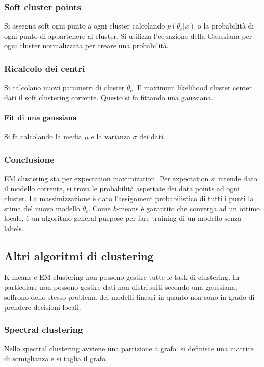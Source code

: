 \subsubsection{Soft cluster points}
Si assegna soft ogni punto a ogni cluster calcolando $p(\theta_c|x)$ o la probabilit\`a di ogni punto di appartenere al cluster.
Si utilizza l'equazione della Gaussiana per ogni cluster normalizzata per creare una probabilit\`a.

\subsubsection{Ricalcolo dei centri}
Si calcolano nuovi parametri di cluster $\theta_c$.
Il maximum likelihood cluster center dati il soft clustering corrente.
Questo si fa fittando una gaussiana.

\paragraph{Fit di una gaussiana}
Si fa calcolando la media $\mu$ e la varianza $\sigma$ dei dati.

\subsubsection{Conclusione}
EM clustering sta per expectation maximization.
Per expectation si intende dato il modello corrente, si trova le probabilit\`a aspettate dei data points ad ogni cluster.
La massimizzazione \`e dato l'assignment probabilistico di tutti i punti la stima del nuovo modello $\theta_c$.
Come $k$-means \`e garantito che converga ad un ottimo locale, \`e un algoritmo general purpose per fare training di un modello senza labels.

\subsection{Altri algoritmi di clustering}
K-means e EM-clustering non possono gestire tutte le task di clustering.
In particolare non possono gestire dati non distribuiti secondo una gaussiana, soffrono dello stesso problema dei modelli lineari in quanto non sono in grado di prendere decisioni locali.

\subsubsection{Spectral clustering}
Nello spectral clustering avviene una partizione a grafo: si definisce una matrice di somiglianza e si taglia il grafo.

